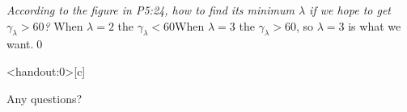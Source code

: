 \documentclass[
        ]{beamer}
\begin{document}
    		\begin{frame}[c]{\subsecname}
    			\begin{overprint}
    			\emph{According to the figure in P5:24, how to find its minimum $\lambda$ if we hope to get $\gamma_{\lambda}>60$?}
    				\onslide<2>  %
    				When $\lambda=2$ the $\gamma_{\lambda}<60$When \alert{$\lambda=3$} the $\gamma_{\lambda}>60$, so $\lambda=3$ is what we want.\qed
    			\end{overprint}
    		\end{frame}

    \begin{frame}<handout:0>[c]{\secname}
        \centerline{\Large{Any questions?}}
    \end{frame}
    
    
    
\end{document}
